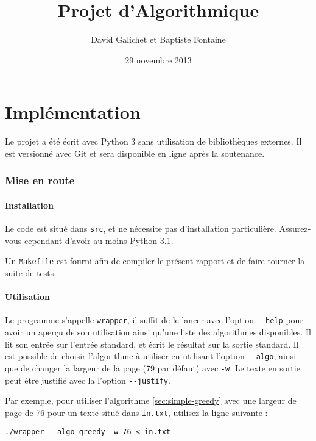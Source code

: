\documentclass[a4paper, 11pt]{article}
\begin{document}
\title{Projet d'Algorithmique}
\author{David Galichet et Baptiste Fontaine}
\date{29 novembre 2013}
\maketitle
\tableofcontents
\newpage


\part{Implémentation}

Le projet a été écrit avec Python 3 sans utilisation de bibliothèques externes.
Il est versionné avec Git et sera disponible en ligne après la soutenance.

\section{Mise en route}
\subsection{Installation}

Le code est situé dans \verb|src|, et ne nécessite pas d'installation
particulière. Assurez-vous cependant d'avoir au moins Python 3.1.

Un \verb|Makefile| est fourni afin de compiler le présent rapport et de faire
tourner la suite de tests.

\subsection{Utilisation}

Le programme s'appelle \verb|wrapper|, il suffit de le lancer avec l'option
\verb|--help| pour avoir un aperçu de son utilisation ainsi qu'une liste des
algorithmes disponibles. Il lit son entrée sur l'entrée standard, et écrit le
résultat sur la sortie standard. Il est possible de choisir l'algorithme à
utiliser en utilisant l'option \verb|--algo|, ainsi que de changer la largeur
de la page (79 par défaut) avec \verb|-w|. Le texte en sortie peut être
justifié avec la l'option \verb|--justify|.

Par exemple, pour utiliser l'algorithme \ref{sec:simple-greedy} avec une largeur
de page de 76 pour un texte situé dans \verb|in.txt|, utilisez la ligne suivante
:

\begin{verbatim}
./wrapper --algo greedy -w 76 < in.txt
\end{verbatim}
\end{document}
